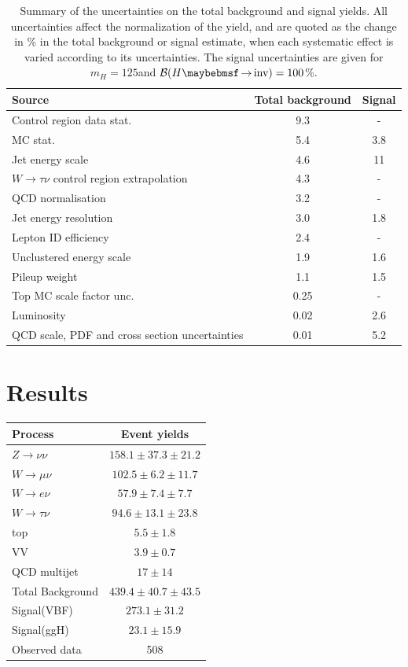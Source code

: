 \begin{table}[!htb]
\centering
\label{tab:syst-qqH}
\begin{tabular}{lcc}
\hline \hline
Source  & Total background & Signal     \\
\hline
Control region data stat. & 9.3 & - \\
MC stat. & 5.4 & 3.8 \\
Jet energy scale & 4.6 & 11 \\ 
$W\rightarrow\tau\nu$ control region extrapolation & 4.3 & - \\ 
QCD normalisation & 3.2 & - \\ 
Jet energy resolution & 3.0 & 1.8 \\ 
Lepton ID efficiency & 2.4 & - \\ 
Unclustered energy scale & 1.9 & 1.6 \\ 
Pileup weight & 1.1 & 1.5 \\ 
Top MC scale factor unc. & 0.25 & - \\ 
Luminosity & 0.02 & 2.6 \\ 
QCD scale, PDF and cross section uncertainties & 0.01 & 5.2 \\
\hline \hline
\end{tabular}
\caption{Summary of the uncertainties on the total background and signal yields. All uncertainties affect the normalization of the yield, and are quoted as the change in \% in the total background or signal estimate, when each systematic effect is varied according to its uncertainties. The signal uncertainties are given for $m_H=125$\GeV and $\BRinv=100$\%.}
\end{table}

\section{Results}

\begin{tabular}{lc}
\hline \hline
Process & Event yields \\
\hline
$Z\rightarrow\nu\nu$&$158.1 \pm 37.3 \pm 21.2$\\
$W\rightarrow\mu\nu$&$102.5 \pm 6.2 \pm 11.7$\\
$W\rightarrow e\nu$&$57.9 \pm 7.4 \pm 7.7$\\
$W\rightarrow\tau\nu$&$94.6 \pm 13.1 \pm 23.8$\\
top&$5.5 \pm  1.8$\\
VV&$3.9 \pm 0.7$\\
QCD multijet &$17\pm 14$\\
\hline
Total Background &$439.4 \pm 40.7 \pm 43.5 $\\
\hline
Signal(VBF) &$273.1 \pm 31.2 $\\
Signal(ggH) &$23.1 \pm 15.9 $\\
\hline
Observed data & 508 \\
\hline \hline
\end{tabular}

